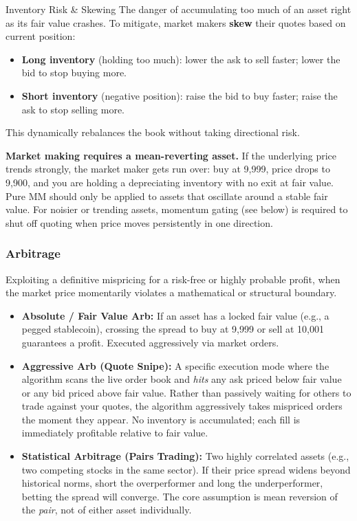 \begin{keyterm}{Inventory Risk \& Skewing}
The danger of accumulating too much of an asset right as its fair value crashes.
To mitigate, market makers \textbf{skew} their quotes based on current position:
\begin{itemize}[noitemsep]
  \item \textbf{Long inventory} (holding too much): lower the ask to sell faster;
        lower the bid to stop buying more.
  \item \textbf{Short inventory} (negative position): raise the bid to buy faster;
        raise the ask to stop selling more.
\end{itemize}
This dynamically rebalances the book without taking directional risk.
\end{keyterm}

\begin{warningbox}
\textbf{Market making requires a mean-reverting asset.}
If the underlying price trends strongly, the market maker gets run over:
buy at 9{,}999, price drops to 9{,}900, and you are holding a depreciating
inventory with no exit at fair value. Pure MM should only be applied to assets
that oscillate around a stable fair value. For noisier or trending assets,
momentum gating (see below) is required to shut off quoting when price moves
persistently in one direction.
\end{warningbox}

\subsubsection{Arbitrage}

Exploiting a definitive mispricing for a risk-free or highly probable profit, when the
market price momentarily violates a mathematical or structural boundary.

\begin{itemize}
  \item \textbf{Absolute / Fair Value Arb:} If an asset has a locked fair value
        (e.g., a pegged stablecoin), crossing the spread to buy at 9{,}999 or sell at
        10{,}001 guarantees a profit. Executed aggressively via market orders.
  \item \textbf{Aggressive Arb (Quote Snipe):} A specific execution mode where the
        algorithm scans the live order book and \emph{hits} any ask priced below fair
        value or any bid priced above fair value. Rather than passively waiting for
        others to trade against your quotes, the algorithm aggressively takes
        mispriced orders the moment they appear. No inventory is accumulated; each
        fill is immediately profitable relative to fair value.
  \item \textbf{Statistical Arbitrage (Pairs Trading):} Two highly correlated assets
        (e.g., two competing stocks in the same sector). If their price spread widens
        beyond historical norms, short the overperformer and long the underperformer,
        betting the spread will converge. The core assumption is mean reversion of the
        \emph{pair}, not of either asset individually.
\end{itemize}

